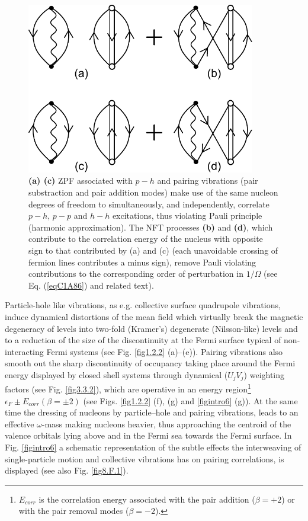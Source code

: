 \begin{figure}
\centerline {
\includegraphics*[width=10cm]{introduccion/figs/figintroF2}
}
\caption{\textbf{(a) (c)} ZPF associated with $p-h$ and pairing vibrations (pair substraction and pair addition modes) make use of the same nucleon degrees of freedom to simultaneously, and independently, correlate  $p-h$, $p-p$ and $h-h$ excitations, thus violating Pauli principle (harmonic approximation). The NFT processes \textbf{(b)} and \textbf{(d)}, which contribute to the correlation energy of the nucleus with opposite sign to that contributed by (a) and (c) (each unavoidable crossing of fermion lines contributes  a minus sign), remove Pauli violating contributions to the corresponding order of perturbation in $1/\Omega$ (see Eq. (\ref{eqC1A86}) and related text).}
\label{figintroF2}
\end{figure}
Particle-hole like vibrations, as e.g. collective surface quadrupole vibrations, induce dynamical distortions of the mean field which virtually break the  magnetic degeneracy of levels into two-fold (Kramer's) degenerate (Nilsson-like) levels and to a reduction of the size of the discontinuity at the Fermi surface typical of non-interacting Fermi systems (see Fig. \ref{fig1.2.2} (a)--(e)). Pairing vibrations also smooth out the sharp discontinuity of occupancy taking place around the Fermi energy  displayed by closed shell systems through dynamical ($U_jV_j$) weighting factors (see Fig. \ref{fig3.3.2}), which are operative in an energy region\footnote{$E_{corr}$ is the correlation energy associated with the pair addition ($\beta=+2$) or with the pair removal modes ($\beta=-2$).}  $\epsilon_F\pm E_{corr}(\beta=\pm2)$ (see Figs. \ref{fig1.2.2} (f), (g) and \ref{figintro6} (g)). At the same time the dressing of nucleons by particle--hole and pairing vibrations, leads to an effective $\omega$-mass making nucleons heavier, thus approaching the centroid of the valence orbitals lying above and in the Fermi sea towards the Fermi surface.  In Fig. \ref{figintro6} a schematic representation of the subtle effects the interweaving of single-particle motion and collective vibrations has on pairing correlations, is displayed (see also Fig. \ref{fig8.F.1}). 

